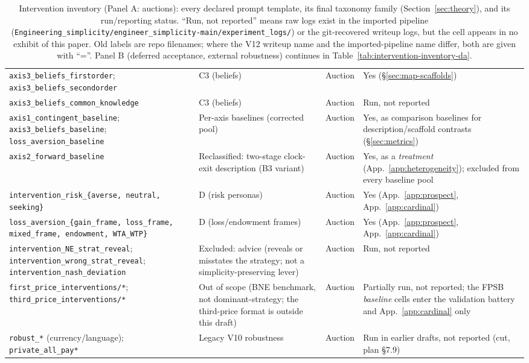 \begin{table}[p]
\begin{tabular}{p{4.9cm} p{3.3cm} p{1.0cm} p{4.4cm}}
\texttt{axis3\_beliefs\_firstorder}; \texttt{axis3\_beliefs\_secondorder} & C3 (beliefs) & Auction & Yes (\S\ref{sec:map-scaffolds}) \\
\texttt{axis3\_beliefs\_common\_knowledge} & C3 (beliefs) & Auction & Run, not reported \\
\texttt{axis1\_contingent\_baseline}; \texttt{axis3\_beliefs\_baseline}; \texttt{loss\_aversion\_baseline} & Per-axis baselines (corrected pool) & Auction & Yes, as comparison baselines for description/scaffold contrasts (\S\ref{sec:metrics}) \\
\texttt{axis2\_forward\_baseline} & Reclassified: two-stage clock-exit description (B3 variant) & Auction & Yes, as a \emph{treatment} (App.~\ref{app:heterogeneity}); excluded from every baseline pool \\
\texttt{intervention\_risk\_\{averse, neutral, seeking\}} & D (risk personas) & Auction & Yes (App.~\ref{app:prospect}, App.~\ref{app:cardinal}) \\
\texttt{loss\_aversion\_\{gain\_frame, loss\_frame, mixed\_frame, endowment, WTA\_WTP\}} & D (loss/endowment frames) & Auction & Yes (App.~\ref{app:prospect}, App.~\ref{app:cardinal}) \\
\texttt{intervention\_NE\_strat\_reveal}; \texttt{intervention\_wrong\_strat\_reveal}; \texttt{intervention\_nash\_deviation} & Excluded: advice (reveals or misstates the strategy; not a simplicity-preserving lever) & Auction & Run, not reported \\
\texttt{first\_price\_interventions/*}; \texttt{third\_price\_interventions/*} & Out of scope (BNE benchmark, not dominant-strategy; the third-price format is outside this draft) & Auction & Partially run, not reported; the FPSB \emph{baseline} cells enter the validation battery and App.~\ref{app:cardinal} only \\
\texttt{robust\_*} (currency/language); \texttt{private\_all\_pay*} & Legacy V10 robustness & Auction & Run in earlier drafts, not reported (cut, plan \S7.9) \\
\bottomrule
\end{tabular}
\caption{Intervention inventory (Panel A: auctions): every declared prompt template, its final taxonomy family (Section~\ref{sec:theory}), and its run/reporting status. ``Run, not reported'' means raw logs exist in the imported pipeline (\texttt{Engineering\_simplicity/engineer\_simplicity-main/experiment\_logs/}) or the git-recovered writeup logs, but the cell appears in no exhibit of this paper. Old labels are repo filenames; where the V12 writeup name and the imported-pipeline name differ, both are given with ``=''. Panel B (deferred acceptance, external robustness) continues in Table~\ref{tab:intervention-inventory-da}.}
\label{tab:intervention-inventory}
\end{table}

